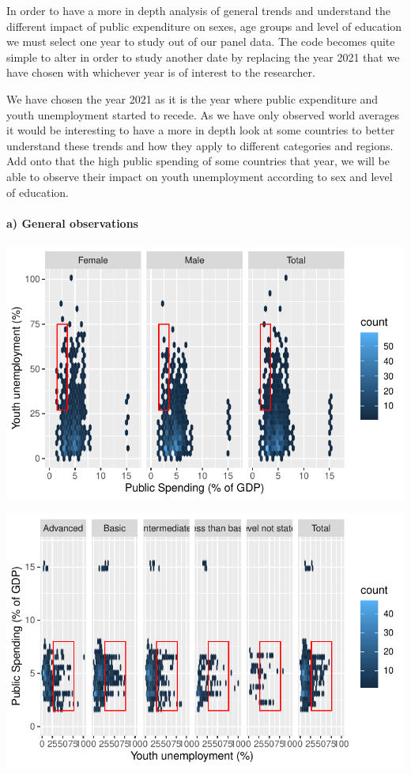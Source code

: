 \documentclass[
  letterpaper,
  DIV=11,
  numbers=noendperiod]{scrartcl}
\let\oldparagraph\paragraph
\renewcommand{\paragraph}[1]{\oldparagraph{#1}\mbox{}}
\begin{document}
In order to have a more in depth analysis of general trends and
understand the different impact of public expenditure on sexes, age
groups and level of education we must select one year to study out of
our panel data. The code becomes quite simple to alter in order to study
another date by replacing the year 2021 that we have chosen with
whichever year is of interest to the researcher.

We have chosen the year 2021 as it is the year where public expenditure
and youth unemployment started to recede. As we have only observed world
averages it would be interesting to have a more in depth look at some
countries to better understand these trends and how they apply to
different categories and regions. Add onto that the high public spending
of some countries that year, we will be able to observe their impact on
youth unemployment according to sex and level of education.

\hypertarget{a-general-observations}{%
\paragraph{a) General observations}\label{a-general-observations}}

\includegraphics{Projet-BM_files/figure-pdf/unnamed-chunk-17-1.pdf}

\includegraphics{Projet-BM_files/figure-pdf/unnamed-chunk-17-2.pdf}
\end{document}
